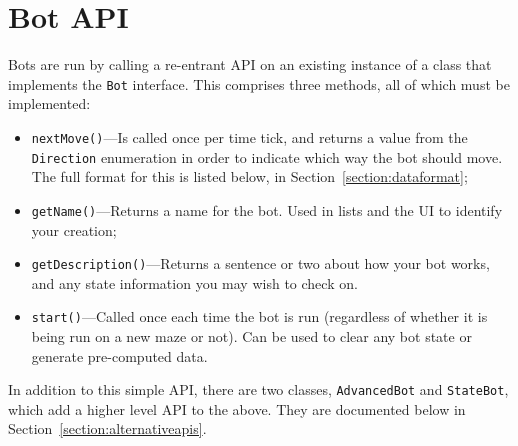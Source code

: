 \documentclass[11pt]{article}
\begin{document}
\section{Bot API}
Bots are run by calling a re-entrant API on an existing instance of a class that implements the \texttt{Bot} interface.  This comprises three methods, all of which must be implemented:
\begin{itemize}
\item \texttt{nextMove()}---Is called once per time tick, and returns a value from the \texttt{Direction} enumeration in order to indicate which way the bot should move.  The full format for this is listed below, in Section~\ref{section:dataformat};
\item \texttt{getName()}---Returns a name for the bot.  Used in lists and the UI to identify your creation;
\item \texttt{getDescription()}---Returns a sentence or two about how your bot works, and any state information you may wish to check on.
\item \texttt{start()}---Called once each time the bot is run (regardless of whether it is being run on a new maze or not).  Can be used to clear any bot state or generate pre-computed data.
\end{itemize}
In addition to this simple API, there are two classes, \texttt{AdvancedBot} and \texttt{StateBot}, which add a higher level API to the above.  They are documented below in Section~\ref{section:alternativeapis}.
\end{document}
